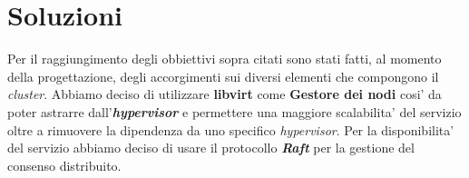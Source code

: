 \section{Soluzioni}
Per il raggiungimento degli obbiettivi sopra citati sono stati fatti,
al momento della progettazione, degli accorgimenti sui diversi 
elementi che compongono il \textit{cluster}.
Abbiamo deciso di utilizzare \textbf{libvirt} come \textbf{Gestore dei nodi} cosi' da poter astrarre 
dall'\textit{\textbf{hypervisor}} e permettere una maggiore scalabilita' del servizio oltre a rimuovere
la dipendenza da uno specifico \textit{hypervisor}.
Per la disponibilita' del servizio abbiamo deciso di usare il protocollo \textit{\textbf{Raft}} per la
gestione del consenso distribuito. 
        
